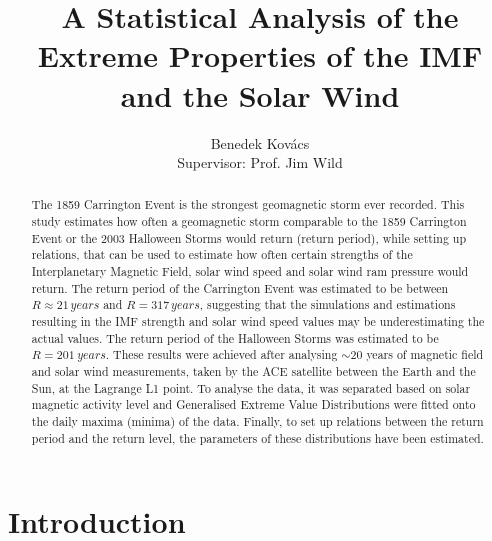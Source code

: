 \documentclass[12pt]{article}
\title{\vspace{-1em}A Statistical Analysis of the Extreme Properties of the IMF and the Solar Wind}
\author{Benedek Kovács\\ Supervisor: Prof. Jim Wild}
\date{}
\begin{document}
\maketitle
\begin{center}
\end{center}
\bigskip
\begin{abstract}
    \noindent The 1859 Carrington Event is the strongest geomagnetic storm ever recorded. This study estimates how often a geomagnetic storm comparable to the 1859 Carrington Event or the 2003 Halloween Storms would return (return period), while setting up relations, that can be used to estimate how often certain strengths of the Interplanetary Magnetic Field, solar wind speed and solar wind ram pressure would return. The return period of the Carrington Event was estimated to be between $R\approx 21\, years$ and $R=317\, years$, suggesting that the simulations and estimations resulting in the IMF strength and solar wind speed values may be underestimating the actual values. The return period of the Halloween Storms was estimated to be $R=201\ years$. These results were achieved after analysing $\sim 20$ years of magnetic field and solar wind measurements, taken by the ACE satellite between the Earth and the Sun, at the Lagrange L1 point. To analyse the data, it was separated based on solar magnetic activity level and Generalised Extreme Value Distributions were fitted onto the daily maxima (minima) of the data. Finally, to set up relations between the return period and the return level, the parameters of these distributions have been estimated.
\end{abstract}
\newpage
\restoregeometry
\tableofcontents
\newpage
\pagestyle{fancy}
\fancyhf{}
\lhead{\leftmark}
\cfoot{\thepage}

\section{Introduction}\label{sec:introduction}
\end{document}
